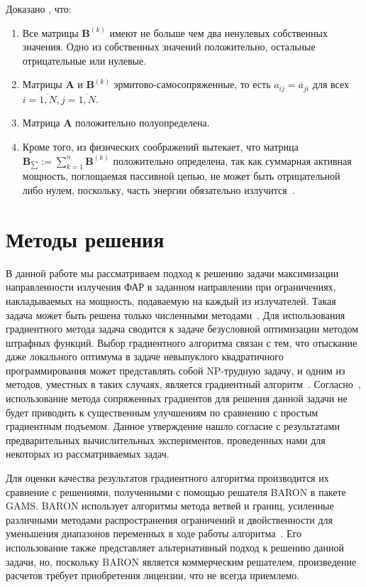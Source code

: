 Доказано \cite{yurkov:farkv}, что:
%
\begin{enumerate}
  \item Все матрицы $\textbf{B}^{(k)}$ имеют не больше чем два ненулевых собственных значения. Одно из собственных значений положительно,
  остальные отрицательные или нулевые.
  \item Матрицы $\textbf{A}$ и $\textbf{B}^{(k)}$ эрмитово-самосопряженные, то есть
  $a_{ij} = \overline{a}_{ji}$ для всех $i = \overline{1,N}, j = \overline{1,N}$.
  \item Матрица $\textbf{A}$ положительно полуопределена.
  \item Кроме того, из физических соображений вытекает, что матрица $\textbf{B}_{\sum}:= \sum_{k=1}^{n} \textbf{B}^{(k)}$
  положительно определена, так как суммарная активная мощность, поглощаемая пассивной цепью, не может быть отрицательной либо нулем,
  поскольку, часть энергии обязательно излучится~\cite{yurkov:farkv}.
\end{enumerate}

\section{Методы решения}

В данной работе мы рассматриваем подход к решению задачи максимизации направленности излучения ФАР в заданном направлении при ограничениях, накладываемых на мощность, подаваемую на каждый из излучателей. Такая задача может быть решена только численными методами~\cite{yurkov:farkv}. Для использования градиентного метода задача сводится к задаче безусловной оптимизации методом штрафных функций. Выбор градиентного алгоритма связан с тем, что отыскание даже локального оптимума в задаче невыпуклого квадратичного программирования может представлять собой NP-трудную задачу, и одним из методов, уместных в таких случаях, является градиентный алгоритм~\cite{murty:np}. Согласно~\cite{nesterov:nonconvex}, использование метода сопряженных градиентов для решения данной задачи не будет приводить к существенным улучшениям по сравнению с простым градиентным подъемом. Данное утверждение нашло согласие с результатами предварительных вычислительных экспериментов, проведенных нами для некоторых из рассматриваемых задач.

Для оценки качества результатов градиентного алгоритма производится их сравнение с решениями, полученными с помощью решателя
BARON в пакете GAMS. BARON использует алгоритмы метода ветвей и границ, усиленные различными методами распространения ограничений и двойственности для уменьшения диапазонов переменных в ходе работы алгоритма~\cite{ryoo:nlp}. Его использование также представляет альтернативный подход к решению данной задачи, но, поскольку BARON является коммерческим решателем, произведение расчетов требует приобретения лицензии, что не всегда приемлемо.


